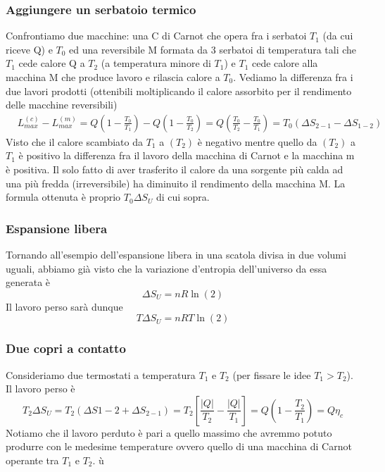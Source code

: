 \documentclass[10pt,a4paper]{article}
\begin{document}
\subsubsection{Aggiungere un serbatoio termico}
Confrontiamo due macchine: una C di Carnot che opera fra i serbatoi \(T_1\) (da cui riceve Q) e \(T_0\) ed una reversibile M formata da 3 serbatoi di temperatura tali che \(T_1\) cede calore Q a \(T_2\) (a temperatura minore di \(T_1\)) e \(T_1\) cede calore alla macchina M che produce lavoro e rilascia calore a \(T_0\). Vediamo la differenza fra i due lavori prodotti (ottenibili moltiplicando il calore assorbito per il rendimento delle macchine reversibili)
\begin{align*}
	&L_{max}^{(c)}-L_{max}^{(m)}=Q\left(1-\frac{T_0}{T_1}\right)-Q\left(1-\frac{T_0}{T_2}\right)=Q\left(\frac{T_0}{T_2}-\frac{T_0}{T_1}\right)=T_0(\Delta S_{2-1}-\Delta S_{1-2}) 
\end{align*}
Visto che il calore scambiato da \(T_1\) a \((T_2)\) è negativo mentre quello da \((T_2)\) a \(T_1\) è positivo la differenza fra il lavoro della macchina di Carnot e la macchina m è positiva. Il solo fatto di aver trasferito il calore da una sorgente più calda ad una più fredda (irreversibile) ha diminuito il rendimento della macchina M. La formula ottenuta è proprio \(T_0\Delta S_U\) di cui sopra. 
\subsubsection{Espansione libera}
Tornando all'esempio dell'espansione libera in una scatola divisa in due volumi uguali, abbiamo già visto che la variazione d'entropia dell'universo da essa generata è \[\Delta S_U = n R \ln(2)\]
Il lavoro perso sarà dunque \[T\Delta S_U = n R T \ln(2)\]
\subsubsection{Due copri a contatto}
Consideriamo due termostati a temperatura \(T_1\) e \(T_2\) (per fissare le idee \(T_1 > T_2\)). Il lavoro perso è 
\[T_2 \Delta S_U = T_2(\Delta S{1-2}+\Delta S_{2-1})=T_2\left[\frac{|Q|}{T_2}-\frac{|Q|}{T_1}\right] = Q\left(1-\frac{T_2}{T_1}\right) =Q\eta_c\]
Notiamo che il lavoro perduto è pari a quello massimo che avremmo potuto produrre con le medesime temperature ovvero quello di una macchina di Carnot operante tra \(T_1\) e \(T_2\). ù
\end{document}
